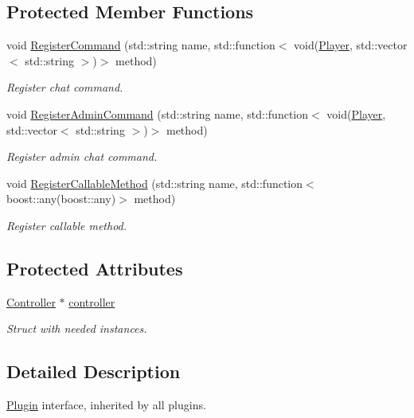 \subsection*{Protected Member Functions}
\begin{DoxyCompactItemize}
\item 
void \hyperlink{classPlugin_a1f1b16c36188ef19f2f8d3a2fdc42578}{Register\-Command} (std\-::string name, std\-::function$<$ void(\hyperlink{structPlayer}{Player}, std\-::vector$<$ std\-::string $>$)$>$ method)
\begin{DoxyCompactList}\small\item\em Register chat command. \end{DoxyCompactList}\item 
void \hyperlink{classPlugin_a99eca8fe24acb076090e76a502f4c1ed}{Register\-Admin\-Command} (std\-::string name, std\-::function$<$ void(\hyperlink{structPlayer}{Player}, std\-::vector$<$ std\-::string $>$)$>$ method)
\begin{DoxyCompactList}\small\item\em Register admin chat command. \end{DoxyCompactList}\item 
void \hyperlink{classPlugin_a3c053c7efbed950494f16fc91228e7fd}{Register\-Callable\-Method} (std\-::string name, std\-::function$<$ boost\-::any(boost\-::any)$>$ method)
\begin{DoxyCompactList}\small\item\em Register callable method. \end{DoxyCompactList}\end{DoxyCompactItemize}
\subsection*{Protected Attributes}
\begin{DoxyCompactItemize}
\item 
\hypertarget{classPlugin_acd252bdd0b4050df6f221032d50acbe4}{\hyperlink{structController}{Controller} $\ast$ \hyperlink{classPlugin_acd252bdd0b4050df6f221032d50acbe4}{controller}}\label{classPlugin_acd252bdd0b4050df6f221032d50acbe4}

\begin{DoxyCompactList}\small\item\em Struct with needed instances. \end{DoxyCompactList}\end{DoxyCompactItemize}


\subsection{Detailed Description}
\hyperlink{classPlugin}{Plugin} interface, inherited by all plugins. 

